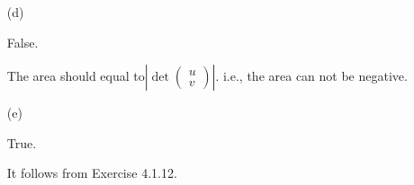 \begin{Exercise}
\begin{enumerate}[(a)]
\item[(d)]
\begin{answer}
False.
\end{answer}
\begin{solution}
The area should equal to$\left| \det\begin{pmatrix}
u \\
v
\end{pmatrix} \right|$. i.e., the area can not be negative.
\end{solution}

\item[(e)]
\begin{answer}
True.
\end{answer}
\begin{solution}
It follows from Exercise 4.1.12.
\end{solution}

\end{enumerate}
\end{Exercise}